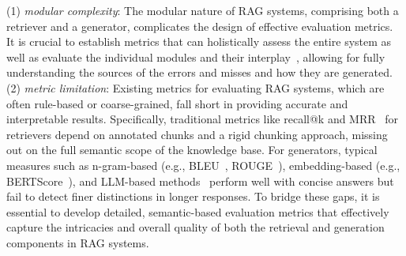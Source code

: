 (1) \emph{modular complexity}: The modular nature of RAG systems, comprising both a retriever and a generator, complicates the design of effective evaluation metrics. It is crucial to establish metrics that can holistically assess the entire system as well as evaluate the individual modules and their interplay~\cite{yu2024evaluation}, allowing for fully understanding the sources of the errors and misses and how they are generated.
(2) \emph{metric limitation}: 
Existing metrics for evaluating RAG systems, which are often rule-based or coarse-grained, fall short in providing accurate and interpretable results. Specifically, traditional metrics like recall@k and MRR~\cite{voorhees1999trec} for retrievers depend on annotated chunks and a rigid chunking approach, missing out on the full semantic scope of the knowledge base. For generators, typical measures such as n-gram-based (e.g., BLEU~\cite{papineni-etal-2002-bleu}, ROUGE~\cite{lin-2004-rouge}), embedding-based (e.g., BERTScore~\cite{zhang2019bertscore}), and LLM-based methods~\cite{wang2024evaluating} perform well with concise answers but fail to detect finer distinctions in longer responses. To bridge these gaps, it is essential to develop detailed, semantic-based evaluation metrics that effectively capture the intricacies and overall quality of both the retrieval and generation components in RAG systems.
